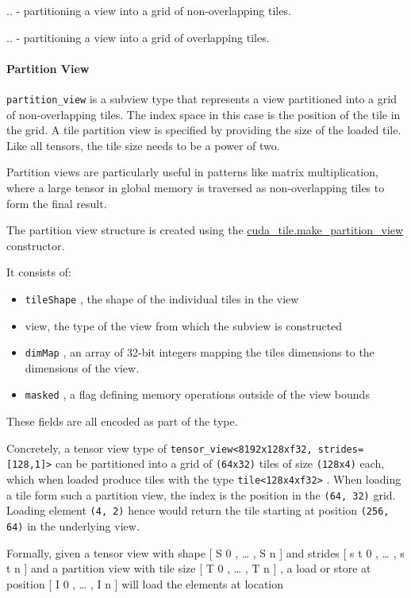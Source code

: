 \documentclass{article}
\begin{document}
.. -  partitioning a view into a grid of non-overlapping tiles.

.. -  partitioning a view into a grid of overlapping tiles.


\paragraph{Partition View}

\texttt{partition\_view} is a subview type that represents a view partitioned into a grid of non-overlapping tiles. The index space in this case is the position of the tile in the grid. A tile partition view is specified by providing the size of the loaded tile. Like all tensors, the tile size needs to be a power of two.


Partition views are particularly useful in patterns like matrix multiplication, where a large tensor in global memory is traversed as non-overlapping tiles to form the final result.


The partition view structure is created using the \href{https://docs.nvidia.com/cuda/tile-ir/latest/sections/operations.html#op-cuda-tile-make-partition-view}{cuda\_tile.make\_partition\_view} constructor.


It consists of:


\begin{itemize}
\item \texttt{tileShape} , the shape of the individual tiles in the view
\item view, the type of the view from which the subview is constructed
\item \texttt{dimMap} , an array of 32-bit integers mapping the tiles dimensions to the dimensions of the view.
\item \texttt{masked} , a flag defining memory operations outside of the view bounds

\end{itemize}
These fields are all encoded as part of the type.


Concretely, a tensor view type of \texttt{tensor\_view<8192x128xf32, strides=[128,1]>} can be partitioned into a grid of \texttt{(64x32)} tiles of size \texttt{(128x4)} each, which when loaded produce tiles with the type \texttt{tile<128x4xf32>} . When loading a tile form such a partition view, the index is the position in the \texttt{(64, 32)} grid. Loading element \texttt{(4, 2)} hence would return the tile starting at position \texttt{(256, 64)} in the underlying view.


Formally, given a tensor view with shape [ S 0 , … , S n ] and strides [ s t 0 , … , s t n ] and a partition view with tile size [ T 0 , … , T n ] , a load or store at position [ I 0 , … , I n ] will load the elements at location
\end{document}
